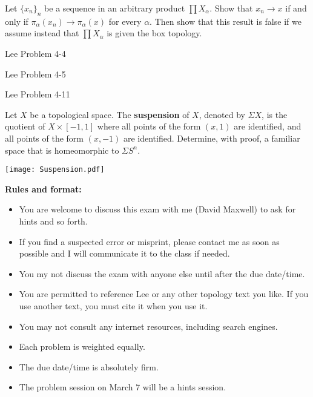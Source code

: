 \documentclass{homework651}
\def\Reals{\mathbb{R}}
\begin{document}
\begin{problems}

\problem Let $\{x_n\}_n$ be a sequence in an arbitrary
product $\prod X_\alpha$. Show that $x_n\to x$ if 
and only if $\pi_\alpha(x_n)\to \pi_\alpha(x)$ for every $\alpha$.
Then show that this result is false if we assume
instead that $\prod X_\alpha$ is given the box topology.

\problem Lee Problem 4-4

\problem Lee Problem 4-5

\problem Lee Problem 4-11

\problem Let $X$ be a topological space.  The {\bf suspension} of $X$, denoted by
$\Sigma X$, is the quotient of $X\times [-1,1]$ where all points of the form $(x,1)$
are identified, and all points of the form $(x,-1)$ are identified.  
Determine, with proof, a familiar space that is homeomorphic to $\Sigma S^n$.

\texttt{[image: Suspension.pdf]}

\newpage
{\bf  Rules and format:}
\begin{itemize}

\item You are welcome to discuss this exam with me (David Maxwell) to ask for hints and so forth.
\item  If you find a suspected error or misprint, please contact me as soon as possible and I will
communicate it to the class if needed.
\item You my not discuss the exam with anyone else until after the due date/time.
\item You are permitted to reference Lee or any other topology text you like.  If you use
another text, you must cite it when you use it.
\item You may not consult any internet resources, including search engines.
\item Each problem is weighted equally.
\item The due date/time is absolutely firm.
\item The problem session on March 7 will be a hints session.
\end{itemize}



\end{problems}
\end{document}
